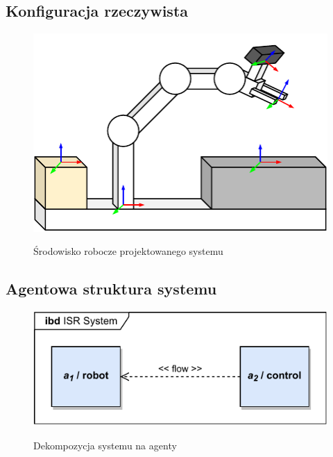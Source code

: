 \subsection{Konfiguracja rzeczywista}
\label{subsec:konfiguracja-urzadzen}

\begin{figure}
    \centering
    \includegraphics[width=\columnwidth]{figures/ISR-system-overview.pdf}
    \label{fig:srodowisko-robocze}
    \caption{Środowisko robocze projektowanego systemu}
\end{figure}

\subsection{Agentowa struktura systemu}
\label{subsec:agentowa-struktura}

\begin{figure}
    \centering
    \includegraphics[width=\columnwidth]{figures/ISR-agents.pdf}
    \label{fig:agenty-system}
    \caption{Dekompozycja systemu na agenty}
\end{figure}

